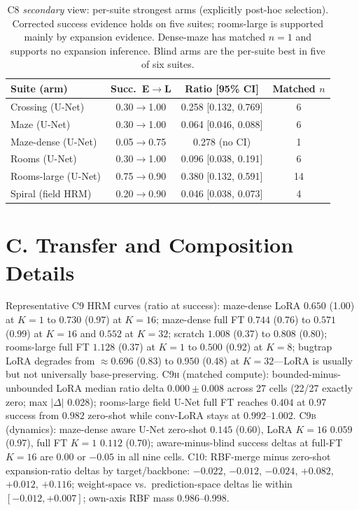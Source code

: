 \documentclass[letterpaper]{article} %
\newcommand{\stage}[1]{\textsc{#1}}
\begin{document}
\begin{table}[h]
\centering
\scriptsize
\setlength{\tabcolsep}{3pt}
\begin{tabular}{@{}lccc@{}}
\toprule
Suite (arm) & Succ.\ E$\to$L & Ratio [95\% CI] & Matched $n$ \\
\midrule
Crossing (U-Net) & 0.30$\to$1.00 & 0.258 [0.132, 0.769] & 6 \\
Maze (U-Net) & 0.30$\to$1.00 & 0.064 [0.046, 0.088] & 6 \\
Maze-dense (U-Net) & 0.05$\to$0.75 & 0.278 (no CI) & 1 \\
Rooms (U-Net) & 0.30$\to$1.00 & 0.096 [0.038, 0.191] & 6 \\
Rooms-large (U-Net) & 0.75$\to$0.90 & 0.380 [0.132, 0.591] & 14 \\
Spiral (field HRM) & 0.20$\to$0.90 & 0.046 [0.038, 0.073] & 4 \\
\bottomrule
\end{tabular}
\caption{\stage{C8} \emph{secondary} view: per-suite strongest arms (explicitly post-hoc selection). Corrected success evidence holds on five suites; rooms-large is supported mainly by expansion evidence. Dense-maze has matched $n{=}1$ and supports no expansion inference. Blind arms are the per-suite best in five of six suites.}
\label{tab:c8}
\end{table}

\section{C. Transfer and Composition Details}

Representative \stage{C9} HRM curves (ratio at success): maze-dense LoRA $0.650$ (1.00) at $K{=}1$ to $0.730$ (0.97) at $K{=}16$; maze-dense full FT $0.744$ (0.76) to $0.571$ (0.99) at $K{=}16$ and $0.552$ at $K{=}32$; scratch $1.008$ (0.37) to $0.808$ (0.80); rooms-large full FT $1.128$ (0.37) at $K{=}1$ to $0.500$ (0.92) at $K{=}8$; bugtrap LoRA degrades from $\approx$0.696 (0.83) to $0.950$ (0.48) at $K{=}32$---LoRA is usually but not universally base-preserving. \stage{C9h} (matched compute): bounded-minus-unbounded LoRA median ratio delta $0.000\pm0.008$ across 27 cells (22/27 exactly zero; max $|\Delta|$ 0.028); rooms-large field U-Net full FT reaches $0.404$ at 0.97 success from $0.982$ zero-shot while conv-LoRA stays at $0.992$--$1.002$. \stage{C9b} (dynamics): maze-dense aware U-Net zero-shot $0.145$ (0.60), LoRA $K{=}16$ $0.059$ (0.97), full FT $K{=}1$ $0.112$ (0.70); aware-minus-blind success deltas at full-FT $K{=}16$ are $0.00$ or $-0.05$ in all nine cells. \stage{C10}: RBF-merge minus zero-shot expansion-ratio deltas by target/backbone: $-0.022$, $-0.012$, $-0.024$, $+0.082$, $+0.012$, $+0.116$; weight-space vs.\ prediction-space deltas lie within $[-0.012, +0.007]$; own-axis RBF mass 0.986--0.998.
\end{document}
